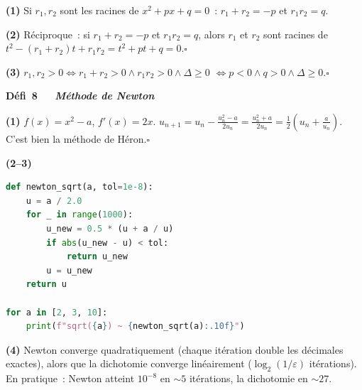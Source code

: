 \textbf{(1)} Si $r_1,r_2$ sont les racines de $x^2+px+q=0$~:
$r_1+r_2=-p$ et $r_1r_2=q$.

\textbf{(2)} R\'eciproque~: si $r_1+r_2=-p$ et $r_1r_2=q$, alors
$r_1$ et $r_2$ sont racines de $t^2-(r_1+r_2)t+r_1r_2=t^2+pt+q=0$.\hfill$\square$

\textbf{(3)} $r_1,r_2>0\Leftrightarrow r_1+r_2>0\wedge r_1r_2>0\wedge\Delta\geq0$
$\Leftrightarrow p<0\wedge q>0\wedge\Delta\geq0$.\hfill$\square$

\noindent{}
{\color{BO}\bfseries\small D\'efi~8~\textendash\ \textit{\algo\ M\'ethode de Newton \computer}}
\par\smallskip

\textbf{(1)} $f(x)=x^2-a$, $f'(x)=2x$.
$u_{n+1}=u_n-\frac{u_n^2-a}{2u_n}=\frac{u_n^2+a}{2u_n}=\frac{1}{2}\!\left(u_n+\frac{a}{u_n}\right)$.
C'est bien la m\'ethode de H\'eron.\hfill$\square$

\textbf{(2--3)}
\begin{lstlisting}[language=Python]
def newton_sqrt(a, tol=1e-8):
    u = a / 2.0
    for _ in range(1000):
        u_new = 0.5 * (u + a / u)
        if abs(u_new - u) < tol:
            return u_new
        u = u_new
    return u

for a in [2, 3, 10]:
    print(f"sqrt({a}) ~ {newton_sqrt(a):.10f}")
\end{lstlisting}

\textbf{(4)} Newton converge quadratiquement (chaque it\'eration double les d\'ecimales exactes),
alors que la dichotomie converge lin\'eairement ($\log_2(1/\varepsilon)$ it\'erations).
En pratique~: Newton atteint $10^{-8}$ en $\sim5$ it\'erations,
la dichotomie en $\sim27$.

